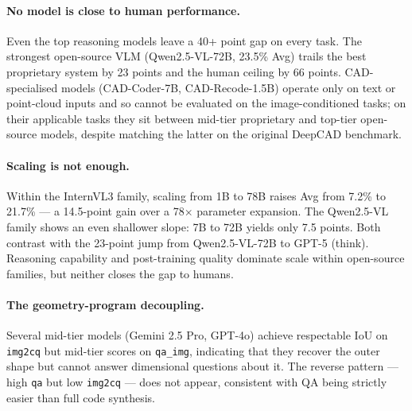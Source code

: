 \documentclass{article}
\begin{document}
\paragraph{No model is close to human performance.} Even the top reasoning models leave a 40+ point gap on every task. The strongest open-source VLM (Qwen2.5-VL-72B, 23.5\% Avg) trails the best proprietary system by 23 points and the human ceiling by 66 points. CAD-specialised models (CAD-Coder-7B, CAD-Recode-1.5B) operate only on text or point-cloud inputs and so cannot be evaluated on the image-conditioned tasks; on their applicable tasks they sit between mid-tier proprietary and top-tier open-source models, despite matching the latter on the original DeepCAD benchmark.

\paragraph{Scaling is not enough.} Within the InternVL3 family, scaling from 1B to 78B raises Avg from 7.2\% to 21.7\% --- a 14.5-point gain over a 78$\times$ parameter expansion. The Qwen2.5-VL family shows an even shallower slope: 7B to 72B yields only 7.5 points. Both contrast with the 23-point jump from Qwen2.5-VL-72B to GPT-5 (think). Reasoning capability and post-training quality dominate scale within open-source families, but neither closes the gap to humans.

\paragraph{The geometry-program decoupling.} Several mid-tier models (Gemini 2.5 Pro, GPT-4o) achieve respectable IoU on \texttt{img2cq} but mid-tier scores on \texttt{qa\_img}, indicating that they recover the outer shape but cannot answer dimensional questions about it. The reverse pattern --- high \texttt{qa} but low \texttt{img2cq} --- does not appear, consistent with QA being strictly easier than full code synthesis.
\end{document}
